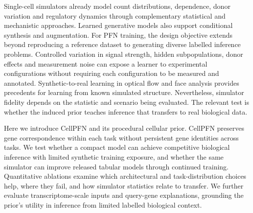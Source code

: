 Single-cell simulators already model count distributions, dependence, donor variation and regulatory dynamics through complementary statistical and mechanistic approaches\cite{zappia2017splatter,zhang2019symsim,sun2021scdesign2,song2024scdesign3,azodi2021splatpop,dibaeinia2020sergio,cannoodt2021dyngen,li2025scmultisim}. Learned generative models also support conditional synthesis and augmentation\cite{marouf2020cscgan,luo2024scdiffusion}. For PFN training, the design objective extends beyond reproducing a reference dataset to generating diverse labelled inference problems. Controlled variation in signal strength, hidden subpopulations, donor effects and measurement noise can expose a learner to experimental configurations without requiring each configuration to be measured and annotated. Synthetic-to-real learning in optical flow and face analysis provides precedents for learning from known simulated structure\cite{dosovitskiy2015flownet,wood2021fake}. Nevertheless, simulator fidelity depends on the statistic and scenario being evaluated\cite{crowell2023shaky,duo2024systematic}. The relevant test is whether the induced prior teaches inference that transfers to real biological data.

Here we introduce CellPFN and its procedural cellular prior. CellPFN preserves gene correspondence within each task without persistent gene identities across tasks. We test whether a compact model can achieve competitive biological inference with limited synthetic training exposure, and whether the same simulator can improve released tabular models through continued training. Quantitative ablations examine which architectural and task-distribution choices help, where they fail, and how simulator statistics relate to transfer. We further evaluate transcriptome-scale inputs and query-gene explanations, grounding the prior's utility in inference from limited labelled biological context.
